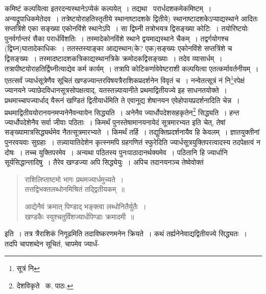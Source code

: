 \documentclass[11pt, openany]{book}
\begin{document}
\noindent कमिष्टं कल्पयित्वा इतरदन्यस्थानेऽप्येकं कल्पयेत्~। तद्यथा \textendash\ परार्धदशकमेकमिष्टम्~। अन्यद्रूपाधिकमेतेदव~। तत्रेष्टयोराहतिस्तृतीये स्थानाष्टादशके द्वितीये) स्थानाष्टादशकेऽप्याद्यस्थाने आदितः सप्तत्रिंशे एका सङ्ख्या एकोनविंशे स्थानेऽपि~। सा द्विघ्नी तत्रोभयत्र द्विसङ्ख्या कोटिः~। तयोरिष्टयोः पुनर्वर्गान्तरं सैका परार्धविंशतिः~। तस्मादेकोनविंशे स्थाने द्वयमाद्यस्थाने चैकम्~। तद्वर्गयोगश्च (द्विघ्न)घातादेकाधिकः~। ततस्तस्याङ्का आद्यस्थान(के? एक)सङ्ख्यः एकोनविंशे सप्तत्रिंशे च द्विसङ्ख्यः~। तस्मादष्टादशकत्रिकाद्यस्थानत्रिके क्रमोदकद्विसङ्ख्याः~। तदेव व्यासार्धम्~। तत्रापीष्टयोराहतिर्द्विघ्नीत्याद्येव कर्म कार्यम्~। तत्रापि कोटिकर्णावेवेष्टराशी कल्पयित्वा एतत्कर्मावर्तनीयम्~। एतत्सर्वं ज्यार्धसूत्रेणैव सूचितं खण्डज्यान्तरविषयत्रैराशिकप्रदर्शनेन विवृतं च~। नन्वेतत्सूत्रं नं नि\renewcommand{\thefootnote}{१}\footnote{सूत्रं नि}रपेक्षं ज्यानयने ज्याछेदविधानसूत्रसोपक्षत्वाद्, यतस्तन्न्यायानीते प्रथमाद्वितीयज्ये इह साधनतयोक्ते~। {\qt प्रथमाच्चापज्यार्धाद् यैरूनं खण्डितं द्वितीयार्धमि}ति ते एवानूद्य शेषानयन एवेहोपायप्रदर्शनादिति चेन्न~। प्रथमाद्वितीययोरानयनमप्यनेनैवन्यायेन सिद्ध्यति~। अनेनैव ज्यार्धोपदेशसहकृतेन\renewcommand{\thefootnote}{२}\footnote{देशविकृते \textendash\ क. पाठः.} सिद्ध्यति~। हन्त ज्यार्धोपदेशेनैव सर्वा जीवाः पठिताः~। किमर्थं पुनस्तेषामानयनायेदं सूत्रमारभ्यत इति चेत्, तेषां सङ्ख्यामात्रसिद्ध्यर्थमेव नैतत्सूत्रमारभ्यते~। किमर्थं तर्हि~। तद्युक्तिप्रदर्शनायैव हि केवलम्~। ज्ञातयुक्तीनां पुनरवयवाः सुग्रहाः~। तन्न्यायातिदेशेन कृत्स्नमपि ग्रहगणितं स्फुरेदिति ज्यार्धसूत्रयुक्तिपरत्वादस्य तदपेक्षत्वं न दोषः~। तच्च युक्तिपरमेव~। अन्यथा पठितस्य पुनःपाठादानर्थक्यमेव~। पठितानि हि ज्यार्धानि सूर्यसिद्धान्तादिषु~। तैरेव खण्डज्या अपि सिद्ध्येयुः~। अपिच तदानयनञ्च तेष्वेवोक्तं\textendash

\begin{quote}
{\qt राशिलिप्ताष्टमो भागः प्रथमज्यार्धमुच्यते~।\\
तत्तद्विभक्तलब्धोनमिश्रितं तद्द्वितीयकम्~॥

आद्येनैवं क्रमात् पिण्डाद् भङ्क्त्वा लब्धोनितैर्युतैः~।\\
खण्डकैः स्युश्चतुर्विंशज्यार्धपिण्डाः क्रमादमी~॥}
\end{quote}

\noindent इति~। तत्र त्रैराशिकं निगूढमिति तदाविष्करणमनेन क्रियते~। कथं तर्ह्यनेनेवाद्यद्वितीयज्ये सिद्ध्यतः~। तदपि चापशब्देन सूचितं, चापमेव ज्यार्धं-

\newpage
\end{document}
